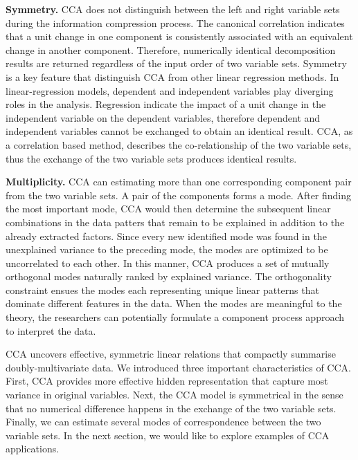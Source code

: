 \textbf{Symmetry.} CCA does not distinguish between the left and right variable sets during the information compression process. The canonical correlation indicates that a unit change in one component is consistently associated with an equivalent change in another component. Therefore, numerically identical decomposition results are returned regardless of the input order of two variable sets. Symmetry is a key feature that distinguish CCA from other linear regression methods. In linear-regression models, dependent and independent variables play diverging roles in the analysis. Regression indicate the impact of a unit change in the independent variable on the dependent variables, therefore dependent and independent variables cannot be exchanged to obtain an identical result. CCA, as a correlation based method, describes the co-relationship of the two variable sets, thus the exchange of the two variable sets produces identical results.

\textbf{Multiplicity.} CCA can estimating more than one corresponding component pair from the two variable sets. A pair of the components forms a mode. After finding the most important mode, CCA would then determine the subsequent linear combinations in the data patters that remain to be explained in addition to the already extracted factors. Since every new identified mode was found in the unexplained variance to the preceding mode, the modes are optimized to be uncorrelated to each other. In this manner, CCA produces a set of mutually orthogonal modes naturally ranked by explained variance. The orthogonality constraint ensues the modes each representing unique linear patterns that dominate different features in the data. When the modes are meaningful to the theory, the researchers can potentially formulate a component process approach to interpret the data.

CCA uncovers effective, symmetric linear relations that compactly summarise doubly-multivariate data. We introduced three important characteristics of CCA. First, CCA provides more effective hidden representation that capture most variance in original variables. Next, the CCA model is symmetrical in the sense that no numerical difference happens in the exchange of the two variable sets. Finally, we can estimate several modes of correspondence between the two variable sets. In the next section, we would like to explore examples of CCA applications.


